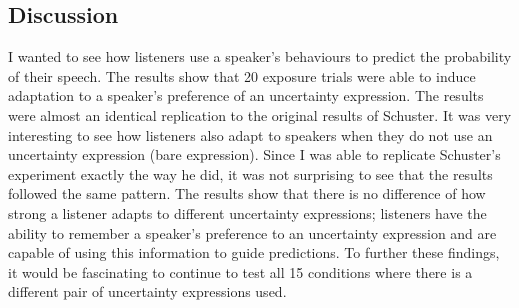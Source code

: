 \documentclass[lucida,biblatex]{sp} %
\begin{document}
\subsection{Discussion}
I wanted to see how listeners use a speaker’s behaviours to predict the probability of their speech. The results show that 20 exposure trials were able to induce adaptation to a speaker’s preference of an uncertainty expression. The results were almost an identical replication to the original results of Schuster. It was very interesting to see how listeners also adapt to speakers when they do not use an uncertainty expression (bare expression). Since I was able to replicate Schuster’s experiment exactly the way he did, it was not surprising to see that the results followed the same pattern. The results show that there is no difference of how strong a listener adapts to different uncertainty expressions; listeners have the ability to remember a speaker’s preference to an uncertainty expression and are capable of using this information to guide predictions. To further these findings, it would be fascinating to continue to test all 15 conditions where there is a different pair of uncertainty expressions used. 


\printbibliography
%




\end{document}
